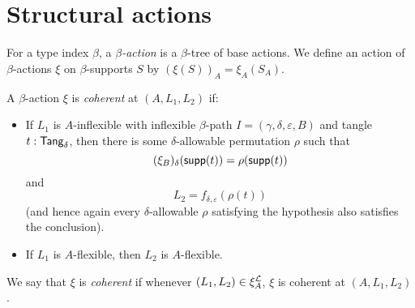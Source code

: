 \section{Structural actions}
\begin{definition}
  \label{def:StrAction}
  For a type index \( \beta \), a \emph{\( \beta \)-action} is a \( \beta \)-tree of base actions.
  We define an action of \( \beta \)-actions \( \xi \) on \( \beta \)-supports \( S \) by \( (\xi(S))_A = \xi_A(S_A) \).
\end{definition}
\begin{definition}
  \label{def:StrAction.Coherent}
  A \( \beta \)-action \( \xi \) is \emph{coherent} at \( (A, L_1, L_2) \) if:
  \begin{itemize}
    \item If \( L_1 \) is \( A \)-inflexible with inflexible \( \beta \)-path \( I = (\gamma, \delta, \varepsilon, B) \) and tangle \( t : \mathsf{Tang}_\delta \), then there is some \( \delta \)-allowable permutation \( \rho \) such that
    \[ (\xi_B)_\delta(\operatorname{\mathsf{supp}}(t)) = \rho(\operatorname{\mathsf{supp}}(t)) \]
    and
    \[ L_2 = f_{\delta,\varepsilon}(\rho(t)) \]
    (and hence again every \( \delta \)-allowable \( \rho \) satisfying the hypothesis also satisfies the conclusion).
    \item If \( L_1 \) is \( A \)-flexible, then \( L_2 \) is \( A \)-flexible.
  \end{itemize}
  We say that \( \xi \) is \emph{coherent} if whenever \( (L_1, L_2) \in \xi_A^{\mathcal L} \), \( \xi \) is coherent at \( (A, L_1, L_2) \).
\end{definition}
